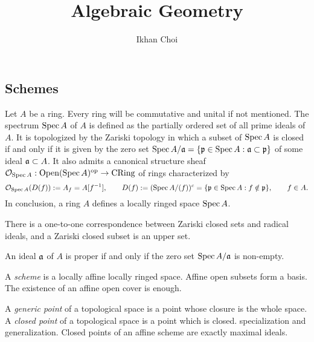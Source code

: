 \documentclass{../../large}
\begin{document}
\title{Algebraic Geometry}
\author{Ikhan Choi}
\maketitle
\tableofcontents

\part{}


\chapter{Schemes}



\begin{prb}
Let $A$ be a ring.
Every ring will be commutative and unital if not mentioned.
The spectrum $\operatorname{Spec} A$ of $A$ is defined as the partially ordered set of all prime ideals of $A$.
It is topologized by the Zariski topology in which a subset of $\operatorname{Spec} A$ is closed if and only if it is given by the zero set $\operatorname{Spec} A/\mathfrak{a}=\{\mathfrak{p}\in\operatorname{Spec} A:\mathfrak{a}\subset\mathfrak{p}\}$ of some ideal $\mathfrak{a}\subset A$.
It also admits a canonical structure sheaf $\mathcal{O}_{\operatorname{Spec} A}:\mathrm{Open}(\operatorname{Spec} A)^{\mathrm{op}}\to\mathrm{CRing}$ of rings characterized by
\[\mathcal{O}_{\operatorname{Spec} A}(D(f)):=A_f=A[f^{-1}],\qquad D(f):=(\operatorname{Spec} A/(f))^c=\{\mathfrak{p}\in\operatorname{Spec} A:f\notin\mathfrak{p}\},\qquad f\in A.\]
In conclusion, a ring $A$ defines a locally ringed space $\operatorname{Spec} A$.
\begin{parts}
\item There is a one-to-one correspondence between Zariski closed sets and radical ideals, and a Zariski closed subset is an upper set.
\item An ideal $\mathfrak{a}$ of $A$ is proper if and only if the zero set $\operatorname{Spec} A/\mathfrak{a}$ is non-empty.
\end{parts}

\end{prb}

\begin{prb}[Schemes]
A \emph{scheme} is a locally affine locally ringed space.
Affine open subsets form a basis.
The existence of an affine open cover is enough.


\end{prb}


A \emph{generic point} of a topological space is a point whose closure is the whole space.
A \emph{closed point} of a topological space is a point which is closed.
specialization and generalization.
Closed points of an affine scheme are exactly maximal ideals.
\end{document}
